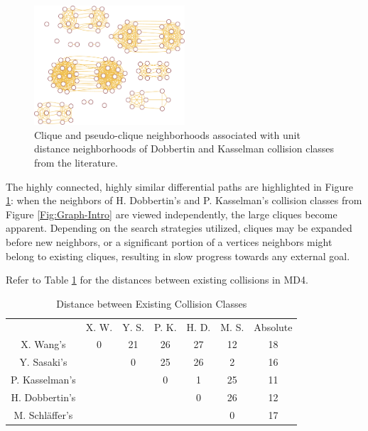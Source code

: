 \documentclass[conference]{IEEEtran}
\begin{document}
\begin{figure}
\begin{center}
\includegraphics[width=0.5\textwidth]{Figs/graph-clique-crop.pdf}
\caption{Clique and pseudo-clique neighborhoods associated with
  unit distance neighborhoods of Dobbertin and Kasselman collision
  classes from the literature.}
\label{Fig:Graph-Clique}
\end{center}
\end{figure}

The highly connected, highly similar differential paths are highlighted in
Figure \ref{Fig:Graph-Clique}: when the neighbors of H. Dobbertin's and
P. Kasselman's collision classes from Figure \ref{Fig:Graph-Intro} are viewed
independently, the large cliques become apparent. Depending on the search
strategies utilized, cliques may be expanded before new neighbors, or a
significant portion of a vertices neighbors might belong to existing cliques,
resulting in slow progress towards any external goal.

Refer to Table \ref{table:distance} for the distances between existing
collisions in MD4.

\begin{table}
    \caption{Distance between Existing Collision Classes}
    \label{table:distance}
    \begin{tabular}{c c c c c c c}
        & X. W. & Y. S. & P. K. & H. D. & M. S. & Absolute \\
        X. Wang's & 0 & 21 & 26 & 27 & 12 & 18 \\
        Y. Sasaki's & & 0 & 25 & 26 & 2 & 16 \\
        P. Kasselman's &  &  & 0 & 1 & 25 & 11 \\
        H. Dobbertin's &  &  &  & 0 & 26 & 12 \\
        M. Schl{\"a}ffer's &  &  &  &  & 0 & 17 \\
    \end{tabular}
\end{table}
\end{document}
